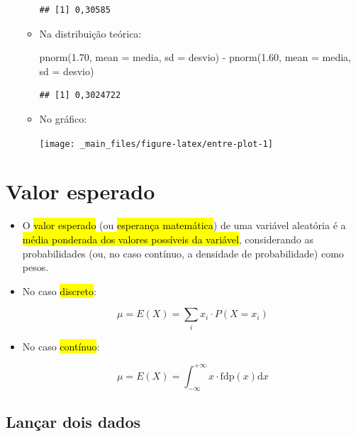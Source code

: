\documentclass[
  11pt]{report}
\newenvironment{Shaded}{\begin{snugshade}}{\end{snugshade}}
\newcommand{\AttributeTok}[1]{\textcolor[rgb]{0.77,0.63,0.00}{#1}}
\newcommand{\FloatTok}[1]{\textcolor[rgb]{0.00,0.00,0.81}{#1}}
\newcommand{\FunctionTok}[1]{\textcolor[rgb]{0.00,0.00,0.00}{#1}}
\newcommand{\NormalTok}[1]{#1}
\newcommand{\SpecialCharTok}[1]{\textcolor[rgb]{0.00,0.00,0.00}{#1}}
\renewenvironment{Shaded}{
    \begin{mdframed}[%
      roundcorner=2pt,%
      innerleftmargin=5pt,%
      innerrightmargin=5pt,%
      topline=true,%
      leftline=true,%
      rightline=true,%
      bottomline=true,%
      linewidth=0.5pt,%
      linecolor=black!20,%
      backgroundcolor=black!2,%
      skipabove=2ex,%
      skipbelow=2.5ex%
    ]%
  }
  {
    \end{mdframed}
  }
\begin{document}
\begin{itemize}
\begin{itemize}
\begin{verbatim}
## [1] 0,30585
\end{verbatim}
  \item
    Na distribuição teórica:

\begin{Shaded}
\begin{Highlighting}[]
\FunctionTok{pnorm}\NormalTok{(}\FloatTok{1.70}\NormalTok{, }\AttributeTok{mean =}\NormalTok{ media, }\AttributeTok{sd =}\NormalTok{ desvio) }\SpecialCharTok{{-}}
\FunctionTok{pnorm}\NormalTok{(}\FloatTok{1.60}\NormalTok{, }\AttributeTok{mean =}\NormalTok{ media, }\AttributeTok{sd =}\NormalTok{ desvio)}
\end{Highlighting}
\end{Shaded}

\begin{verbatim}
## [1] 0,3024722
\end{verbatim}
  \item
    No gráfico:

    \begin{center}\texttt{[image: \_main\_files/figure-latex/entre-plot-1]} \end{center}
  \end{itemize}
\end{itemize}

\hypertarget{valor-esperado}{%
\section{Valor esperado}\label{valor-esperado}}

\begin{itemize}
\item
  O {\hl{valor esperado}} (ou {\hl{esperança matemática}}) de uma variável aleatória é a {\hl{média ponderada dos valores possíveis da variável}}, considerando as probabilidades (ou, no caso contínuo, a densidade de probabilidade) como pesos.
\item
  No caso {\hl{discreto}}:

  \[
  \mu = E(X) = \sum_i x_i \cdot P(X = x_i)
  \]
\item
  No caso {\hl{contínuo}}:

  \[
  \mu = E(X) = \int_{-\infty}^{+\infty} x \cdot \text{fdp}(x) \text{d}x
  \]
\end{itemize}

\hypertarget{lanuxe7ar-dois-dados-1}{%
\subsection{Lançar dois dados}\label{lanuxe7ar-dois-dados-1}}
\end{document}
